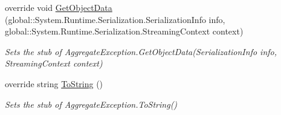 \begin{DoxyCompactItemize}
override void \hyperlink{class_system_1_1_fakes_1_1_stub_aggregate_exception_a9590ed988fed2a94e325873808ad9fb3}{Get\-Object\-Data} (global\-::\-System.\-Runtime.\-Serialization.\-Serialization\-Info info, global\-::\-System.\-Runtime.\-Serialization.\-Streaming\-Context context)
\begin{DoxyCompactList}\small\item\em Sets the stub of Aggregate\-Exception.\-Get\-Object\-Data(\-Serialization\-Info info, Streaming\-Context context)\end{DoxyCompactList}\item 
override string \hyperlink{class_system_1_1_fakes_1_1_stub_aggregate_exception_a4574b544778165a50772ae7931a28783}{To\-String} ()
\begin{DoxyCompactList}\small\item\em Sets the stub of Aggregate\-Exception.\-To\-String()\end{DoxyCompactList}\end{DoxyCompactItemize}
